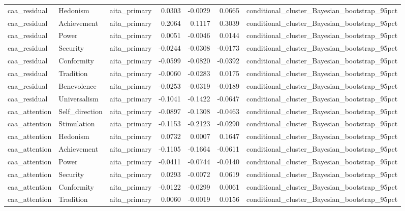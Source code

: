\begin{tabular}{lllrrrl}
caa\_residual & Hedonism & aita\_primary & 0.0303 & -0.0029 & 0.0665 & conditional\_cluster\_Bayesian\_bootstrap\_95pct \\
caa\_residual & Achievement & aita\_primary & 0.2064 & 0.1117 & 0.3039 & conditional\_cluster\_Bayesian\_bootstrap\_95pct \\
caa\_residual & Power & aita\_primary & 0.0051 & -0.0046 & 0.0144 & conditional\_cluster\_Bayesian\_bootstrap\_95pct \\
caa\_residual & Security & aita\_primary & -0.0244 & -0.0308 & -0.0173 & conditional\_cluster\_Bayesian\_bootstrap\_95pct \\
caa\_residual & Conformity & aita\_primary & -0.0599 & -0.0820 & -0.0392 & conditional\_cluster\_Bayesian\_bootstrap\_95pct \\
caa\_residual & Tradition & aita\_primary & -0.0060 & -0.0283 & 0.0175 & conditional\_cluster\_Bayesian\_bootstrap\_95pct \\
caa\_residual & Benevolence & aita\_primary & -0.0253 & -0.0319 & -0.0189 & conditional\_cluster\_Bayesian\_bootstrap\_95pct \\
caa\_residual & Universalism & aita\_primary & -0.1041 & -0.1422 & -0.0647 & conditional\_cluster\_Bayesian\_bootstrap\_95pct \\
caa\_attention & Self\_direction & aita\_primary & -0.0897 & -0.1308 & -0.0463 & conditional\_cluster\_Bayesian\_bootstrap\_95pct \\
caa\_attention & Stimulation & aita\_primary & -0.1153 & -0.2123 & -0.0290 & conditional\_cluster\_Bayesian\_bootstrap\_95pct \\
caa\_attention & Hedonism & aita\_primary & 0.0732 & 0.0007 & 0.1647 & conditional\_cluster\_Bayesian\_bootstrap\_95pct \\
caa\_attention & Achievement & aita\_primary & -0.1105 & -0.1664 & -0.0611 & conditional\_cluster\_Bayesian\_bootstrap\_95pct \\
caa\_attention & Power & aita\_primary & -0.0411 & -0.0744 & -0.0140 & conditional\_cluster\_Bayesian\_bootstrap\_95pct \\
caa\_attention & Security & aita\_primary & 0.0293 & -0.0072 & 0.0619 & conditional\_cluster\_Bayesian\_bootstrap\_95pct \\
caa\_attention & Conformity & aita\_primary & -0.0122 & -0.0299 & 0.0061 & conditional\_cluster\_Bayesian\_bootstrap\_95pct \\
caa\_attention & Tradition & aita\_primary & 0.0060 & -0.0019 & 0.0156 & conditional\_cluster\_Bayesian\_bootstrap\_95pct \\

\end{tabular}
